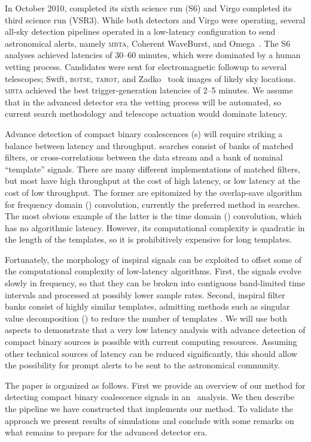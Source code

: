 In October 2010, \LIGO{} completed its sixth science run
(S6) and Virgo completed its third science run (VSR3).  While both
\LIGO{} detectors and Virgo were operating, several all-sky detection
pipelines operated in a low-latency configuration to send astronomical alerts,
namely \textsc{mbta}, Coherent WaveBurst, and
Omega~\cite{HugheyGWPAW2011, S6lowlatency}.
 The S6 analyses
achieved latencies of 30--60 minutes, which were dominated by a human vetting
process. Candidates were sent for electromagnetic followup to several
telescopes; Swift, \textsc{rotse}, \textsc{tarot}, and Zadko~\cite{kanner2008,
HugheyGWPAW2011} took images of likely sky locations.  \textsc{mbta} achieved
the best \GW{} trigger-generation latencies of 2--5 minutes.  We
assume that in the advanced detector era the vetting process will be automated,
so current \GW{} search methodology and telescope actuation would
dominate latency.

Advance detection of compact binary coalescences (\CBC{}s) will require striking a balance between latency
and throughput.  \CBC{} searches consist of banks of matched filters, or
cross-correlations between the data stream and a bank of nominal ``template''
signals.  There are many different implementations of matched filters, but most
have high throughput at the cost of high latency, or low latency at the cost of
low throughput.  The former are epitomized by the overlap-save algorithm
\cite{numerical-recipes-chapter-13} for frequency domain (\FD) convolution,
currently the preferred method in \GW{}
searches.  The most obvious example of the latter is the time domain
(\TD) convolution, which has no algorithmic latency.  However, its
computational complexity is quadratic in the length of the templates, so it is
prohibitively expensive for long templates.

Fortunately, the morphology of inspiral signals can be exploited to offset some
of the computational complexity of low-latency algorithms.  First, the signals
evolve slowly in frequency, so that they can be broken into contiguous
band-limited time intervals and processed at possibly lower sample rates.
Second, inspiral filter banks consist of highly similar templates, admitting
methods such as singular value decomposition (\SVD{}) to reduce the number of
templates \cite{Cannon:2010p10398}. We will use both aspects to demonstrate that a very
low latency analysis with advance detection of compact binary sources is
possible with current computing resources.  Assuming other technical sources of
latency can be reduced significantly, this should allow the possibility for
prompt alerts to be sent to the astronomical community.

The paper is organized as follows. First we provide an overview of our method
for detecting compact binary coalescence signals in an \earlywarning\ analysis.
We then describe the pipeline we have constructed that implements our method.
To validate the approach we present results of simulations and conclude with
some remarks on what remains to prepare for the advanced detector era.

